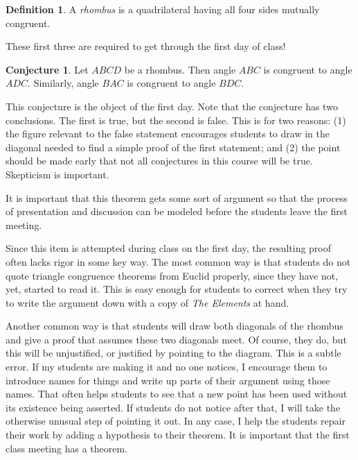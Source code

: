 \documentclass{tufte-handout}
\theoremstyle{definition}
\newtheorem{conjecture}[problem]{Conjecture}
\newtheorem*{definition}{Definition}
\begin{document}
\begin{definition}\label{defn:rhombus}
A \emph{rhombus} is a quadrilateral having all four sides mutually congruent.
\end{definition}

These first three are required to get through the first day of class! 


\begin{conjecture}
\label{conj:rhombus-angles}
Let $ABCD$ be a rhombus. Then angle $ABC$ is congruent to angle $ADC$. Similarly, angle $BAC$ is congruent to angle $BDC$.
\end{conjecture}

This conjecture is the object of the first day.
Note that the conjecture has two conclusions.
The first is true, but the second is false.
This is for two reasons:
(1) the figure relevant to the false statement encourages students to draw in the diagonal needed to find a simple proof of the first statement; and
(2) the point should be made early that not all conjectures in this course will be true.
Skepticism is important.

It is important that this theorem gets some sort of argument so that the process of presentation and discussion can be modeled before the students leave the first meeting.

Since this item is attempted during class on the first day, the resulting proof often lacks rigor in some key way. The most common way is that students do not quote triangle congruence theorems from Euclid properly, since they have not, yet, started to read it. This is easy enough for students to correct when they try to write the argument down with a copy of \emph{The Elements} at hand. 

Another common way is that students will draw both diagonals of the rhombus and give a proof that assumes these two diagonals meet. Of course, they do, but this will be unjustified, or justified by pointing to the diagram. 
This is a subtle error. If my students are making it and no 
one notices, I encourage them to introduce names for things and write up parts of their argument using those names.
That often helps students to see that a new point has been used without its existence being asserted. If students do not notice after that, I will take the otherwise unusual step of pointing it out. In any case, I help the students repair their work by adding a hypothesis to their theorem. It is important that the first class meeting has a theorem.\\
\end{document}
